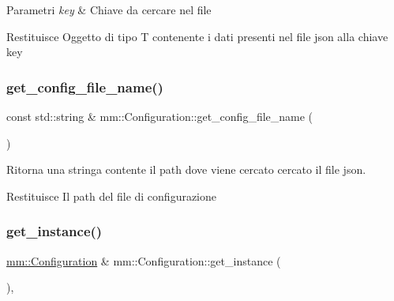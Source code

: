 \begin{DoxyParams}{Parametri}
{\em key} & Chiave da cercare nel file \\
\hline
\end{DoxyParams}
\begin{DoxyReturn}{Restituisce}
Oggetto di tipo {\ttfamily T} contenente i dati presenti nel file json alla chiave {\ttfamily key} 
\end{DoxyReturn}
\mbox{\label{classmm_1_1_configuration_a631c8525beb91fb55d72eb6b58d2d68f}} 
\subsubsection{\texorpdfstring{get\+\_\+config\+\_\+file\+\_\+name()}{get\_config\_file\_name()}}
{\footnotesize\ttfamily const std\+::string \& mm\+::\+Configuration\+::get\+\_\+config\+\_\+file\+\_\+name (\begin{DoxyParamCaption}{ }\end{DoxyParamCaption})\hspace{0.3cm}{\ttfamily [static]}}



Ritorna una stringa contente il path dove viene cercato cercato il file json. 

\begin{DoxyReturn}{Restituisce}
Il path del file di configurazione 
\end{DoxyReturn}
\mbox{\label{classmm_1_1_configuration_a5cfc5ea56062f53ef9fbd274f6dbe79e}} 
\subsubsection{\texorpdfstring{get\+\_\+instance()}{get\_instance()}}
{\footnotesize\ttfamily \mbox{\hyperlink{classmm_1_1_configuration}{mm\+::\+Configuration}} \& mm\+::\+Configuration\+::get\+\_\+instance (\begin{DoxyParamCaption}{ }\end{DoxyParamCaption})\hspace{0.3cm}{\ttfamily [static]}, {\ttfamily [noexcept]}}



